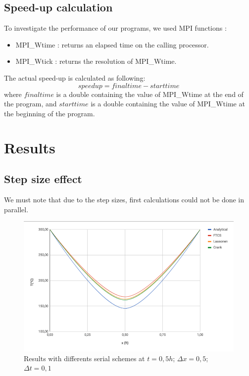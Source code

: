 \documentclass{article}
\begin{document}
                \subsection{Speed-up calculation}
                    To investigate the performance of our programs, we used MPI functions :
                    \begin{itemize}
                        \item MPI\_Wtime : returns an elapsed time on the calling processor.\cite{mpi_doc}
                        \item MPI\_Wtick : returns the resolution of MPI\_Wtime.\cite{mpi_doc}
                    \end{itemize}
                    The actual speed-up is calculated as following:
                    \begin{equation}
                        speedup = finaltime - starttime
                    \end{equation}
                    where $finaltime$ is a double containing the value of MPI\_Wtime at the end of the program,
                    and $starttime$ is a double containing the value of MPI\_Wtime at the beginning of the program.
    
    
        \newpage
        \section{Results}
            \subsection{Step size effect}

                We must note that due to the step sizes, first calculations could not be done in parallel.
                \begin{figure}[H]
                    \includegraphics[width=\textwidth]{step_size_1.png}
                    \caption{Results with differents serial schemes at $t = 0,5h$; $\Delta x=0,5$; $\Delta t=0,1$}
                \end{figure}
\end{document}
